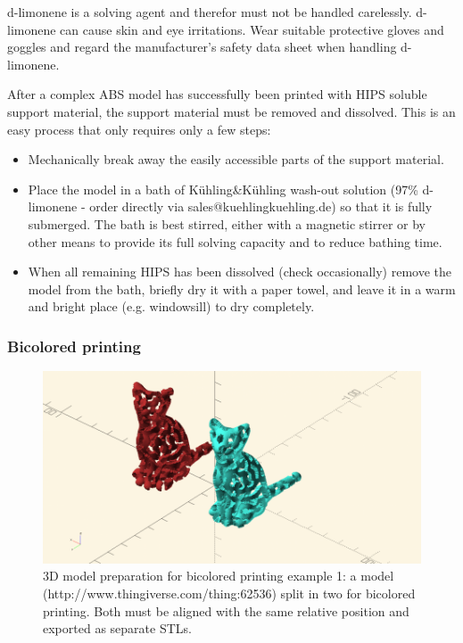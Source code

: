 \begin{danger}
  d-limonene is a solving agent and therefor must not be handled carelessly.
  d-limonene can cause skin and eye irritations.
  Wear suitable protective gloves and goggles and regard the manufacturer's safety data sheet when handling d-limonene. 
\end{danger}

After a complex ABS model has successfully been printed with HIPS soluble support material, the support material must be removed and dissolved. This is an easy process that only requires only a few steps:

\begin{itemize}
  \item Mechanically break away the easily accessible parts of the support material.
  \item Place the model in a bath of Kühling\&Kühling wash-out solution (97\% d-limonene - 
        order directly via sales@kuehlingkuehling.de) so that it is fully submerged. The bath is best stirred, either with a magnetic stirrer or by other means to provide its full solving capacity and to reduce bathing time.
  \item When all remaining HIPS has been dissolved (check occasionally) remove the model 
        from the bath, briefly dry it with a paper towel, and leave it in a warm and bright place (e.g. windowsill) to dry completely.
\end{itemize}


\subsubsection{Bicolored printing} \label{sec:bicoloredprinting}

\begin{figure}[H]
  \centering
  \includegraphics[width=.7\linewidth]{./img/cat_split.png}
  \caption{3D model preparation for bicolored printing example 1:
           a model (http://www.thingiverse.com/thing:62536) split in two for bicolored printing. Both must be aligned with the same relative position and exported as separate STLs.}
\end{figure}


